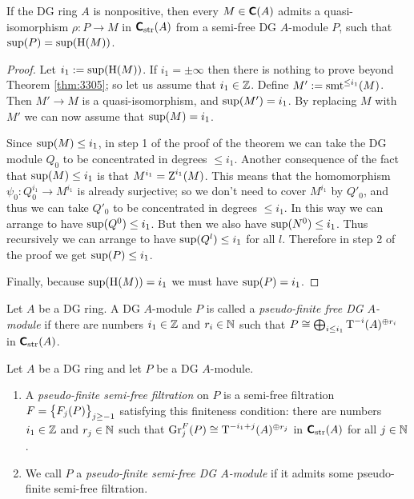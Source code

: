 \begin{cor} \label{cor:3340}
If the DG ring $A$ is nonpositive, then every $M \in \operatorname{\boldsymbol{\mathsf{C}}}(A)$ admits a 
quasi-iso\-morphism $\rho : P \to M$ in $\boldsymbol{\mathsf{C}}_{\mathrm{str}}(A)$ from a 
semi-free DG $A$-module $P$, such that 
$\operatorname{sup}(P) = \operatorname{sup}(\operatorname{H}(M))$. 
\end{cor}

\begin{proof}
Let $i_1 := \operatorname{sup}(\operatorname{H}(M))$. If $i_1 = \pm \infty$ then there is nothing 
to prove beyond Theorem \ref{thm:3305}; so let us assume that $i_1 \in \mathbb{Z}$. 
Define $M' := \operatorname{smt}^{\leq i_1}(M)$. Then $M' \to M$ is a quasi-isomorphism, 
and $\operatorname{sup}(M') = i_1$. By replacing $M$ with $M'$ we can now assume that 
$\operatorname{sup}(M) = i_1$.

Since $\operatorname{sup}(M) \leq i_1$, in step 1 of the proof of the theorem we can 
take the DG module $Q_0$ to be concentrated in degrees $\leq i_1$.
Another consequence of the fact that $\operatorname{sup}(M) \leq i_1$ is that 
$M^{i_1} = \operatorname{Z}^{i_1}(M)$. This means that the homomorphism 
$\psi_0 : Q^{i_1}_0 \to M^{i_1}$ is already surjective; so we don't need to 
cover $M^{i_1}$ by $Q'_0$, and thus we can take $Q'_0$ to be concentrated in 
degrees $\leq i_1$. In this way we can arrange to have $\operatorname{sup}(Q^0) \leq 
i_1$. But then we also have $\operatorname{sup}(N^0) \leq i_1$. Thus 
recursively we can arrange to have $\operatorname{sup}(Q^l) \leq i_1$ for all $l$. 
Therefore in step 2 of the proof we get $\operatorname{sup}(P) \leq i_1$. 

Finally, because $\operatorname{sup}(\operatorname{H}(M)) = i_1$ we must have 
$\operatorname{sup}(P) = i_1$.
\end{proof}

\begin{dfn} \label{dfn:3355}
Let $A$ be a DG ring. A DG $A$-module $P$ is called a {\em 
pseudo-finite free DG $A$-module} if there are numbers $i_1 \in \mathbb{Z}$ and 
$r_i \in \mathbb{N}$ such that 
$ P \cong \bigoplus_{i \leq i_1} \operatorname{T}^{-i}(A)^{\oplus r_i}$
in $\boldsymbol{\mathsf{C}}_{\mathrm{str}}(A)$. 
\end{dfn}

\begin{dfn} \label{dfn:1925}
Let $A$ be a DG ring and let $P$ be a DG $A$-module. 
\begin{enumerate}
\item A {\em pseudo-finite semi-free filtration}%
on $P$ is a semi-free 
filtration $F = \lb \bigl\{ F_j(P) \bigr\}_{j \geq -1}$
satisfying this finiteness condition: there are numbers 
$i_1 \in \mathbb{Z}$ and $r_j \in \mathbb{N}$ such that 
$\operatorname{Gr}^F_j(P) \cong \operatorname{T}^{-i_1 + j}(A)^{\oplus r_j}$
in $\boldsymbol{\mathsf{C}}_{\mathrm{str}}(A)$ for all $j \in \mathbb{N}$. 

\item We call $P$ a {\em pseudo-finite semi-free DG $A$-module}%
if it admits some pseudo-finite semi-free filtration.
\end{enumerate}
\end{dfn}

